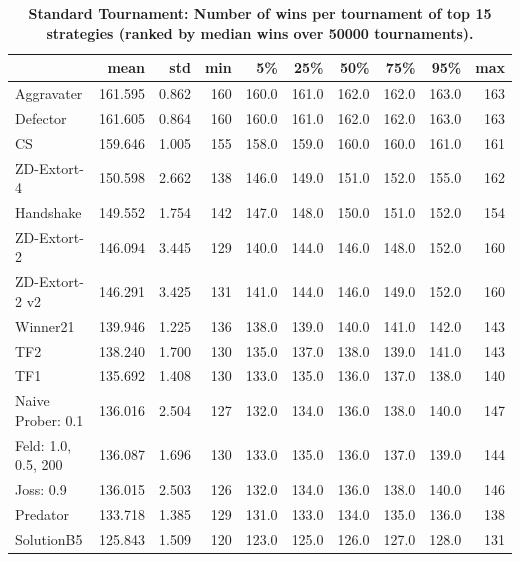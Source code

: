 \documentclass[10pt,letterpaper]{article}
\begin{document}
\begin{table}[!hbtp]
    \centering
        \caption{\bf Standard Tournament: Number of wins per tournament
        of top 15 strategies (ranked by median wins over
        50000 tournaments). }
        \label{tbl:standard_wins_top_winners}
\begin{tabular}{lrrrrrrrrr}
\toprule
{} &     mean &    std &  min &     5\% &    25\% &    50\% &    75\% &    95\% &  max \\
\midrule
Aggravater          &  161.595 &  0.862 &  160 &  160.0 &  161.0 &  162.0 &  162.0 &  163.0 &  163 \\
Defector            &  161.605 &  0.864 &  160 &  160.0 &  161.0 &  162.0 &  162.0 &  163.0 &  163 \\
CS                  &  159.646 &  1.005 &  155 &  158.0 &  159.0 &  160.0 &  160.0 &  161.0 &  161 \\
ZD-Extort-4         &  150.598 &  2.662 &  138 &  146.0 &  149.0 &  151.0 &  152.0 &  155.0 &  162 \\
Handshake           &  149.552 &  1.754 &  142 &  147.0 &  148.0 &  150.0 &  151.0 &  152.0 &  154 \\
ZD-Extort-2         &  146.094 &  3.445 &  129 &  140.0 &  144.0 &  146.0 &  148.0 &  152.0 &  160 \\
ZD-Extort-2 v2      &  146.291 &  3.425 &  131 &  141.0 &  144.0 &  146.0 &  149.0 &  152.0 &  160 \\
Winner21            &  139.946 &  1.225 &  136 &  138.0 &  139.0 &  140.0 &  141.0 &  142.0 &  143 \\
TF2                 &  138.240 &  1.700 &  130 &  135.0 &  137.0 &  138.0 &  139.0 &  141.0 &  143 \\
TF1                 &  135.692 &  1.408 &  130 &  133.0 &  135.0 &  136.0 &  137.0 &  138.0 &  140 \\
Naive Prober: 0.1   &  136.016 &  2.504 &  127 &  132.0 &  134.0 &  136.0 &  138.0 &  140.0 &  147 \\
Feld: 1.0, 0.5, 200 &  136.087 &  1.696 &  130 &  133.0 &  135.0 &  136.0 &  137.0 &  139.0 &  144 \\
Joss: 0.9           &  136.015 &  2.503 &  126 &  132.0 &  134.0 &  136.0 &  138.0 &  140.0 &  146 \\
Predator            &  133.718 &  1.385 &  129 &  131.0 &  133.0 &  134.0 &  135.0 &  136.0 &  138 \\
SolutionB5          &  125.843 &  1.509 &  120 &  123.0 &  125.0 &  126.0 &  127.0 &  128.0 &  131 \\
\bottomrule
\end{tabular}
\end{table}
\end{document}
